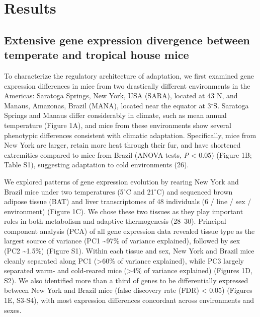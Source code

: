 \documentclass[9pt,twocolumn,twoside,lineno]{pnas-new}
\begin{document}
\hypertarget{results}{%
\section*{Results}\label{results}}

\hypertarget{extensive-gene-expression-divergence-between-temperate-and-tropical-house-mice}{%
\subsection*{Extensive gene expression divergence between temperate and
tropical house
mice}\label{extensive-gene-expression-divergence-between-temperate-and-tropical-house-mice}}

To characterize the regulatory architecture of adaptation, we first
examined gene expression differences in mice from two drastically
different environments in the Americas: Saratoga Springs, New York, USA
(SARA), located at 43\(^{\circ}\)N, and Manaus, Amazonas, Brazil (MANA),
located near the equator at 3\(^{\circ}\)S. Saratoga Springs and Manaus
differ considerably in climate, such as mean annual temperature (Figure
1A), and mice from these environments show several phenotypic
differences consistent with climatic adaptation. Specifically, mice from
New York are larger, retain more heat through their fur, and have
shortened extremities compared to mice from Brazil (ANOVA tests,
\emph{P} \textless{} 0.05) (Figure 1B; Table S1), suggesting adaptation
to cold environments (26).

\vspace{-1pt}

We explored patterns of gene expression evolution by rearing New York
and Brazil mice under two temperatures (5\(^{\circ}\)C and
21\(^{\circ}\)C) and sequenced brown adipose tissue (BAT) and liver
transcriptomes of 48 individuals (6 / line / sex / environment) (Figure
1C). We chose these two tissues as they play important roles in both
metabolism and adaptive thermogenesis (28--30). Principal component
analysis (PCA) of all gene expression data revealed tissue type as the
largest source of variance (PC1 \textasciitilde97\% of variance
explained), followed by sex (PC2 \textasciitilde1.5\%) (Figure S1).
Within each tissue and sex, New York and Brazil mice cleanly separated
along PC1 (\textgreater60\% of variance explained), while PC3 largely
separated warm- and cold-reared mice (\textgreater4\% of variance
explained) (Figures 1D, S2). We also identified more than a third of
genes to be differentially expressed between New York and Brazil mice
(false discovery rate (FDR) \textless{} 0.05) (Figures 1E, S3-S4), with
most expression differences concordant across environments and sexes.
\end{document}
